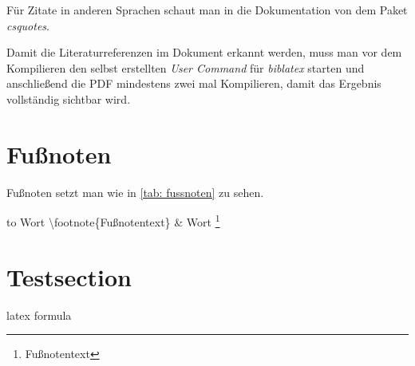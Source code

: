 Für Zitate in anderen Sprachen schaut man in die Dokumentation von dem Paket \emph{csquotes}.%

Damit die Literaturreferenzen im Dokument erkannt werden, muss man vor dem Kompilieren den selbst erstellten \emph{User Command} für \emph{biblatex} starten und anschließend die PDF mindestens zwei mal Kompilieren, damit das Ergebnis vollständig sichtbar wird.%
%
%
\section{Fußnoten}%
Fußnoten setzt man wie in \ref{tab: fussnoten} zu sehen.\\%
\begin{table}[h]%
\begin{tabu} to \textwidth {X[c]X[c]}%
\toprule%
Wort \textbackslash footnote\{Fußnotentext\} & Wort \footnote{Fußnotentext} \\%
\bottomrule%
\end{tabu}%
\caption{Fußnoten}%
\label{tab: fussnoten}%
\end{table}%
%
%
\section{Testsection}

\gls{latex}
\Gls{formula}


\newpage
